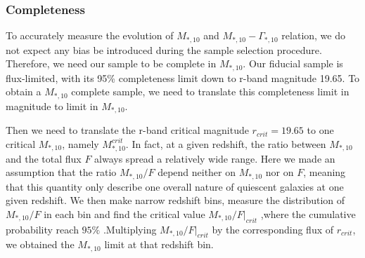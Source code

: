 \documentclass[fleqn,usenatbib]{mnras}
\begin{document}
\subsubsection{Completeness}
To accurately measure the evolution of $M_{*,10}$ and $M_{*,10} - \Gamma_{*,10} $ relation, we do not expect any bias be introduced during the sample selection procedure. Therefore, we need our sample to be complete in $M_{*,10}$. Our fiducial sample is flux-limited, with its 95\% completeness limit down to r-band magnitude 19.65. To obtain a $M_{*,10}$ complete sample, we need to translate this completeness limit in magnitude to limit in $M_{*,10}$.
\par Then we need to translate the r-band critical magnitude $r_{crit} = 19.65$ to one critical $M_{*,10}$, namely $M_{*,10}^{crit}$. In fact, at a given redshift, the ratio between $M_{*,10}$ and the total flux $F$ always spread a relatively wide range. Here we made an assumption that the ratio $M_{*,10} / F$ depend neither on $M_{*,10} $ nor on $F$, meaning that this quantity only describe one overall nature of quiescent galaxies at one given redshift. We then make narrow redshift bins, measure the distribution of $M_{*,10} / F$ in each bin and find the critical value $M_{*,10} / F|_{crit}$
 ,where the cumulative probability reach $95\%$ .Multiplying $M_{*,10} / F|_{crit}$ by the corresponding flux of $r_{crit}$, we obtained the $M_{*,10}$ limit at that redshift bin. 
\end{document}
